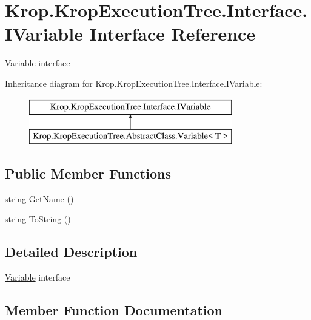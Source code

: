 \hypertarget{interface_krop_1_1_krop_execution_tree_1_1_interface_1_1_i_variable}{}\section{Krop.\+Krop\+Execution\+Tree.\+Interface.\+I\+Variable Interface Reference}
\label{interface_krop_1_1_krop_execution_tree_1_1_interface_1_1_i_variable}


\mbox{\hyperlink{namespace_krop_1_1_krop_execution_tree_1_1_variable}{Variable}} interface  


Inheritance diagram for Krop.\+Krop\+Execution\+Tree.\+Interface.\+I\+Variable\+:\begin{figure}[H]
\begin{center}
\leavevmode
\includegraphics[height=2.000000cm]{interface_krop_1_1_krop_execution_tree_1_1_interface_1_1_i_variable}
\end{center}
\end{figure}
\subsection*{Public Member Functions}
\begin{DoxyCompactItemize}
\item 
string \mbox{\hyperlink{interface_krop_1_1_krop_execution_tree_1_1_interface_1_1_i_variable_a0a1ca374f3af72c44d0754c00e8c26d3}{Get\+Name}} ()
\item 
string \mbox{\hyperlink{interface_krop_1_1_krop_execution_tree_1_1_interface_1_1_i_variable_a4d3f36256ae24e2550ee0a16d3142822}{To\+String}} ()
\end{DoxyCompactItemize}


\subsection{Detailed Description}
\mbox{\hyperlink{namespace_krop_1_1_krop_execution_tree_1_1_variable}{Variable}} interface 



\subsection{Member Function Documentation}
\mbox{\label{interface_krop_1_1_krop_execution_tree_1_1_interface_1_1_i_variable_a0a1ca374f3af72c44d0754c00e8c26d3}} 
